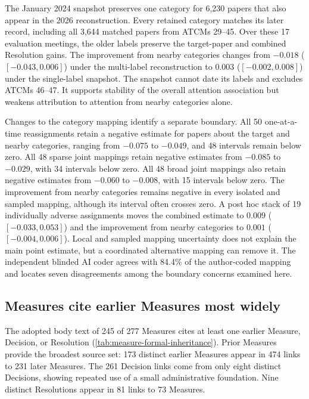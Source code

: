 \documentclass{fun_article}
\begin{document}
The January 2024 snapshot preserves one category for 6,230 papers that also appear in the 2026 reconstruction. Every retained category matches its later record, including all 3,644 matched papers from ATCMs 29--45. Over these 17 evaluation meetings, the older labels preserve the target-paper and combined Resolution gains. The improvement from nearby categories changes from $-0.018$ ($[-0.043,0.006]$) under the multi-label reconstruction to $0.003$ ($[-0.002,0.008]$) under the single-label snapshot. The snapshot cannot date its labels and excludes ATCMs 46--47. It supports stability of the overall attention association but weakens attribution to attention from nearby categories alone.

Changes to the category mapping identify a separate boundary. All 50 one-at-a-time reassignments retain a negative estimate for papers about the target and nearby categories, ranging from $-0.075$ to $-0.049$, and 48 intervals remain below zero. All 48 sparse joint mappings retain negative estimates from $-0.085$ to $-0.029$, with 34 intervals below zero. All 48 broad joint mappings also retain negative estimates from $-0.060$ to $-0.008$, with 15 intervals below zero. The improvement from nearby categories remains negative in every isolated and sampled mapping, although its interval often crosses zero. A post hoc stack of 19 individually adverse assignments moves the combined estimate to $0.009$ ($[-0.033,0.053]$) and the improvement from nearby categories to $0.001$ ($[-0.004,0.006]$). Local and sampled mapping uncertainty does not explain the main point estimate, but a coordinated alternative mapping can remove it. The independent blinded AI coder agrees with 84.4\% of the author-coded mapping and locates seven disagreements among the boundary concerns examined here.

\subsection{Measures cite earlier Measures most widely}\label{sec:formal-inheritance-results}
The adopted body text of 245 of 277 Measures cites at least one earlier Measure, Decision, or Resolution (\cref{tab:measure-formal-inheritance}). Prior Measures provide the broadest source set: 173 distinct earlier Measures appear in 474 links to 231 later Measures. The 261 Decision links come from only eight distinct Decisions, showing repeated use of a small administrative foundation. Nine distinct Resolutions appear in 81 links to 73 Measures.
\end{document}
